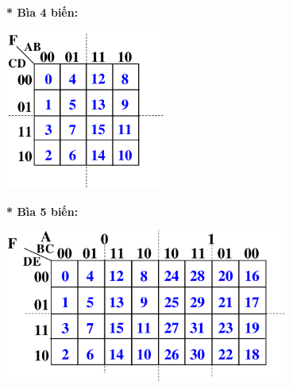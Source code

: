 \textbf{* Bìa 4 biến:}
\begin{center}
    \includegraphics[width = 0.4\textwidth]{./local/image/30.png}
\end{center}
\textbf{* Bìa 5 biến:}
\begin{center}
    \includegraphics[width = 0.7\textwidth]{./local/image/31.png}
\end{center}

